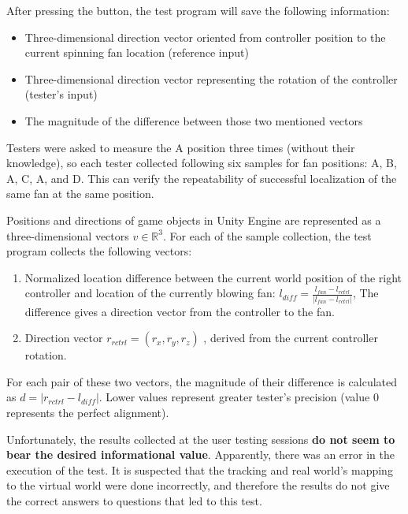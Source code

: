 \pagebreak

After pressing the button, the test program will save the following information:

\begin{itemize}
    \itemsep0em
\item Three-dimensional direction vector oriented from controller position to
the current spinning fan location (reference input)
\item Three-dimensional direction vector representing the rotation of the
controller (tester’s input)
\item The magnitude of the difference between those two mentioned vectors
\end{itemize}

Testers were asked to measure the A position three times (without their knowledge),
so each tester collected following six samples for fan positions: A, B, A, C,
A, and D. This can verify the repeatability of successful
localization of the same fan at the same position.

Positions and directions of game objects in Unity Engine are represented as 
a three-dimensional vectors \( v \in \mathbb{R}^3 \). For each of the sample collection, 
the test program collects the following vectors:

\begin{enumerate}
\item{Normalized location difference between the current world position of the right
controller and location of the currently blowing fan:
\( l_{diff} = \frac{l_{fan} - l_{rctrl}}{|l_{fan} - l_{rctrl}|} \),
 The difference gives a direction vector from the controller to the fan.}
\item{Direction vector \( r_{rctrl} = (r_x, r_y, r_z) \) , derived from the current controller rotation.}
\end{enumerate}

For each pair of these two vectors, the magnitude of their difference is calculated
as \( d = | r_{rctrl} - l_{diff} | \).
Lower values represent greater tester’s precision (value \( 0 \) represents the 
perfect alignment).


Unfortunately, the results collected at the user testing sessions
\textbf{do not seem to bear the desired informational value}.
Apparently, there was an error in the execution of the test. It is suspected that
the tracking and real world’s mapping to the virtual world were done
incorrectly, and therefore the results do not give the correct answers to
questions that led to this test.

